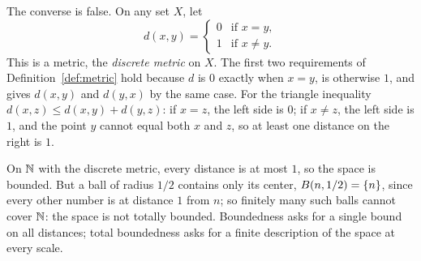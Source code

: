 The converse is false. On any set $X$, let
\[
 d(x,y)=\begin{cases}0&\text{if }x=y,\\1&\text{if }x\ne y.\end{cases}
\]
This is a metric, the \emph{discrete metric} on $X$. The first two requirements of Definition~\ref{def:metric} hold because $d$ is $0$ exactly when $x=y$, is otherwise $1$, and gives $d(x,y)$ and $d(y,x)$ by the same case. For the triangle inequality $d(x,z)\le d(x,y)+d(y,z)$: if $x=z$, the left side is $0$; if $x\ne z$, the left side is $1$, and the point $y$ cannot equal both $x$ and $z$, so at least one distance on the right is $1$.

On $\mathbb N$ with the discrete metric, every distance is at most $1$, so the space is bounded. But a ball of radius $1/2$ contains only its center, $B(n,1/2)=\left\{n\right\}$, since every other number is at distance $1$ from $n$; so finitely many such balls cannot cover $\mathbb N$: the space is not totally bounded. Boundedness asks for a single bound on all distances; total boundedness asks for a finite description of the space at every scale.

